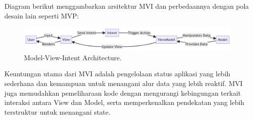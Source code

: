 Diagram berikut menggambarkan arsitektur MVI dan perbedaannya dengan pola desain lain seperti MVP:

\begin{figure}[h]
	\centering
	\includegraphics[width=\textwidth]{../images/mvi.png}
	\caption{Model-View-Intent Architecture.}
	\label{fig:mvi-architecture}
\end{figure}

Keuntungan utama dari MVI adalah pengelolaan status aplikasi yang lebih sederhana dan kemampuan untuk menangani alur data yang lebih reaktif. MVI juga memudahkan pemeliharaan kode dengan mengurangi kebingungan terkait interaksi antara View dan Model, serta memperkenalkan pendekatan yang lebih terstruktur untuk menangani state.


